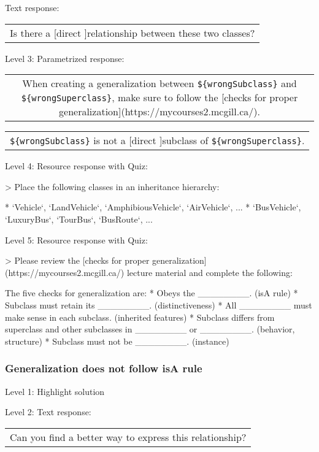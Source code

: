 Text response: \medskip

\begin{tabular}{|c}
Is there a [direct ]relationship between these two classes?
\end{tabular} \medskip

\noindent Level 3: Parametrized response: \medskip

\begin{tabular}{|c}
When creating a generalization between \verb|${wrongSubclass}| and \verb|${wrongSuperclass}|, make sure to follow the [checks for proper generalization](https://mycourses2.mcgill.ca/).
\end{tabular} \medskip

\begin{tabular}{|c}
\verb|${wrongSubclass}| is not a [direct ]subclass of \verb|${wrongSuperclass}|.
\end{tabular} \medskip

\noindent Level 4: Resource response with Quiz:

> Place the following classes in an inheritance hierarchy:

* `Vehicle`, `LandVehicle`, `AmphibiousVehicle`, `AirVehicle`, ...
* `BusVehicle`, `LuxuryBus`, `TourBus`, `BusRoute`, ...

\noindent Level 5: Resource response with Quiz:

> Please review the [checks for proper generalization](https://mycourses2.mcgill.ca/) lecture material
and complete the following:

The five checks for generalization are:
* Obeys the ________. (isA rule)
* Subclass must retain its ________. (distinctiveness)
* All ________ must make sense in each subclass. (inherited features)
* Subclass differs from superclass and other subclasses in ________ or ________. 
(behavior, structure)
* Subclass must not be ________. (instance)


\subsubsection{Generalization does not follow isA rule}

\noindent Level 1: Highlight solution \medskip

\noindent Level 2: Text response: \medskip

\begin{tabular}{|c}
Can you find a better way to express this relationship?
\end{tabular} \medskip

